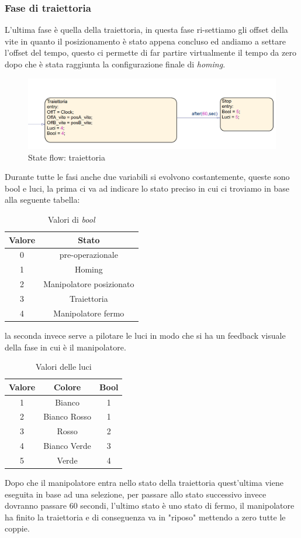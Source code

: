 \subsubsection{Fase di traiettoria}
L'ultima fase è quella della traiettoria, in questa fase ri-settiamo gli offset della vite in quanto il posizionamento è stato appena concluso ed andiamo a settare l'offset del tempo, questo ci permette di far partire virtualmente il tempo da zero dopo che è stata raggiunta la configurazione finale di \textit{homing}. 
\begin{figure}[ht]
\begin{center}
    \includegraphics[scale=0.55]{Immagini/Sperimentale/state3.png}
    \caption{State flow: traiettoria}
\end{center}
\end{figure}
Durante tutte le fasi anche due variabili si evolvono costantemente, queste sono bool e luci, la prima ci va ad indicare lo stato preciso in cui ci troviamo in base alla seguente tabella:
\begin{table}[h!]
\centering
\begin{tabular}{|c |c |} 
 \hline
 Valore & Stato \\ [0.5ex] 
 \hline\hline
  0  & pre-operazionale \\ 
  1 & Homing \\
  2 & Manipolatore posizionato\\
  3 & Traiettoria\\
  4 & Manipolatore fermo\\
 \hline
\end{tabular}
\caption{Valori di \textit{bool}}
\label{table:3}
\end{table}
la seconda invece serve a pilotare le luci in modo che si ha un feedback visuale della fase in cui è il manipolatore.
\begin{table}[h!]
\centering
\begin{tabular}{|c |c|c|} 
 \hline
 Valore & Colore & Bool \\ [0.5ex] 
 \hline\hline
  1  & Bianco & 1 \\ 
  2 &  Bianco Rosso & 1\\
  3 &  Rosso & 2 \\
  4 & Bianco Verde & 3\\
  5 & Verde & 4\\
 \hline
\end{tabular}
\caption{Valori delle luci}
\label{table:4}
\end{table}
Dopo che il manipolatore entra nello stato della traiettoria quest'ultima viene eseguita in base ad una selezione, per passare allo stato successivo invece dovranno passare 60 secondi, l'ultimo stato è uno stato di fermo, il manipolatore ha finito la traiettoria e di conseguenza va in "riposo" mettendo a zero tutte le coppie.
